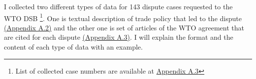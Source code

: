 I collected two different types of data for 143 dispute cases 
requested to the WTO DSB
\footnote{List of collected case numbers are 
available at \hyperref[sub:cited-articles-table]{Appendix A.3}
}.
One is textual description of trade policy 
that led to the dispute \hyperref[sub:factual-aspect-example]{(Appendix A.2)} and the other one is 
set of articles of the WTO agreement that are
cited for each dispute \hyperref[sub:cited-articles-table]{(Appendix A.3)}. 
I will explain the format and the content of 
each type of data with an example. 











  
    
  